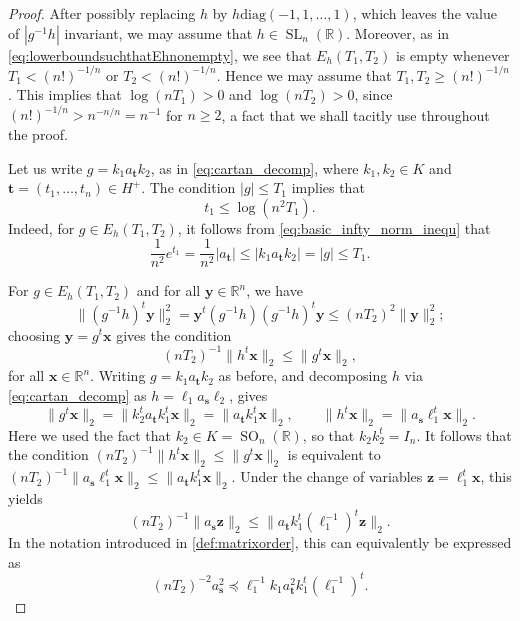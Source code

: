 \documentclass[11pt,reqno]{amsart}
\theoremstyle{definition}
\theoremstyle{remark}
\newcommand{\SL}{\operatorname{SL}}
\newcommand{\SO}{\operatorname{SO}}
\numberwithin{equation}{section}
\numberwithin{thm}{section}
\numberwithin{table}{section}
\def \R {{\mathbb R}}
\newcommand{\z}{\mathbf{z}}
\newcommand{\y}{\mathbf{y}}
\newcommand{\x}{\mathbf{x}}
\begin{document}
\begin{proof}
    After possibly replacing $h$ by $h \mathrm{diag}(-1,1,\ldots,1)$, which leaves the value of $| g^{-1} h |$ invariant, we may assume that $h \in \SL_n(\R)$. 
    Moreover, as in  \eqref{eq:lowerboundsuchthatEhnonempty}, we see that $E_h(T_1,T_2)$ is empty   whenever $ T_1 < (n!)^{-1/n}$ or $T_2 < (n!)^{-1/n}$. Hence we may assume that $T_1, T_2 \ge (n!)^{-1/n}$. This implies that $\log(nT_1)>0$  and $\log(nT_2)>0$, 
since      $(n!)^{-1/n} > n^{-n/n} =n^{-1}$ for $n \ge 2$, 
    a
fact that we shall tacitly use throughout the proof. 
   
    Let us write $g = k_1 a_{\mathbf{t}}k_2$, as in \eqref{eq:cartan_decomp}, where $k_1, k_2 \in K$ and $\mathbf{t} =(t_1,\ldots, t_n) \in H^+$. The condition $ |g| \le T_1$ implies  that
    \begin{equation}\label{eq:condfromT1}
        t_1 \le \log(n^2T_1).
    \end{equation}
    Indeed, for $g \in E_h(T_1,T_2)$,  it follows from \eqref{eq:basic_infty_norm_inequ} that 
    \[
    \frac{1}{n^2} e^{t_1} = \frac{1}{n^2} |a_\mathbf{t}| \le |k_1 a_\mathbf{t}k_2| = |g| \le T_1.
    \]

For $g \in E_h(T_1,T_2)$ and for all $\y \in \R^n$, we have 
    \[
    \| (g^{-1}h)^t \y \|_2^2 = \y^t (g^{-1}h)(g^{-1}h)^t\y  \le (nT_2)^2  \| \y \|_2^2;
    \]
    choosing $\y = g^{t}\x$ gives  the condition
    \[
    (nT_2)^{-1} \| h^t \x \|_2 \le \| g^t\x\|_2 ,
    \]
    for all $\x \in \R^n$.   
    Writing $g = k_1 a_\mathbf{t} k_2$ as before, and decomposing $h$ via \eqref{eq:cartan_decomp} as $h = \ell_1 a_{\mathbf{s}} \ell_2$, gives
    \[
    \| g^t \x \|_2 = \| k_2^t a_{\mathbf{t}} k_1^t \x \|_2 = \| a_{\mathbf{t}} k_1^t \x \|_2,
    \qquad  \| h^t \x \|_2 = \| a_{\mathbf{s}} \ell_1^t \x \|_2.
    \]
    Here we used the fact that $k_2 \in K =\SO_n(\R)$, so that $k_2 k_2^t = I_n$.
It follows that the condition $
     (nT_2)^{-1}\|h^t\x  \|_2 \le \| g^t \x\|_2$ is equivalent to $(nT_2)^{-1}\|a_{\mathbf{s}} \ell_1^t \x \|_2 \le \| a_{\mathbf{t}} k_1^t \x\|_2.$
     Under the change of variables $\z = \ell_1^t \x$, this yields 
     \[
     (nT_2)^{-1}\|a_{\mathbf{s}} \z \|_2 \le \| a_{\mathbf{t}} k_1^t (\ell_1^{-1})^{t} \z \|_2.
     \]
     In the notation introduced in \eqref{def:matrixorder}, this can  equivalently be expressed as 
     \begin{equation}\label{eq:condfromT2}
              (nT_2)^{-2} a_{\mathbf{s}}^2 \preceq \ell_1^{-1} k_1 a_{\mathbf{t}}^2 k_1^t (\ell_1^{-1})^{t}.
     \end{equation}


\end{proof}
\end{document}
